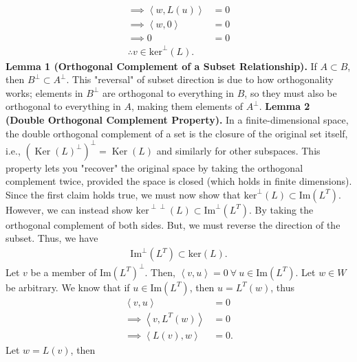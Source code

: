 \documentclass{report}
\begin{document}
\begin{itemize}
\begin{align*}
                \implies \left\langle w, L(u) \right\rangle &= 0 \\
                \implies \left\langle w, 0  \right\rangle &= 0 \\
                \implies 0 &= 0\\ 
                \therefore v \in \text{ker}^{\perp}(L)
            .\end{align*}
            \bigbreak \noindent 
            \textbf{Lemma 1 (Orthogonal Complement of a Subset Relationship).} If \( A \subset B \), then \( B^{\perp} \subset A^{\perp} \). This "reversal" of subset direction is due to how orthogonality works; elements in \( B^{\perp} \) are orthogonal to everything in \( B \), so they must also be orthogonal to everything in \( A \), making them elements of \( A^{\perp} \).
            \bigbreak \noindent 
            \textbf{Lemma 2 (Double Orthogonal Complement Property).} In a finite-dimensional space, the double orthogonal complement of a set is the closure of the original set itself, i.e., \( ( \operatorname{Ker}(L)^{\perp} )^{\perp} = \operatorname{Ker}(L) \) and similarly for other subspaces. This property lets you "recover" the original space by taking the orthogonal complement twice, provided the space is closed (which holds in finite dimensions).
            \bigbreak \noindent 
            Since the first claim holds true, we must now show that $\text{ker}^{\perp}(L) \subset \text{Im}(L^{T})$. However, we can instead show $\text{ker}^{\perp\perp}(L) \subset \text{Im}^{\perp}(L^{T})$. By taking the orthogonal complement of both sides. But, we must reverse the direction of the subset. Thus, we have
            \begin{align*}
                \text{Im}^{\perp}(L^{T}) \subset \text{ker}(L)
            .\end{align*}
            \bigbreak \noindent 
            Let $v$ be a member of $\text{Im}(L^{T})^{\perp}$. Then, $\left\langle v,u \right\rangle  = 0 \ \forall \ u\in \text{Im}(L^{T})$. Let $w\in W$ be arbitrary. We know that if $u \in \text{Im}(L^{T})$, then $u = L^{T}(w)$, thus
            \begin{align*}
                \left\langle v,u \right\rangle &= 0 \\
                \implies \left\langle v, L^{T}(w) \right\rangle &= 0\\
                \implies \left\langle L(v), w \right\rangle &= 0
            .\end{align*}
            Let $w=L(v)$, then
            \begin{align*}

\end{align*}
\end{itemize}
\end{document}
